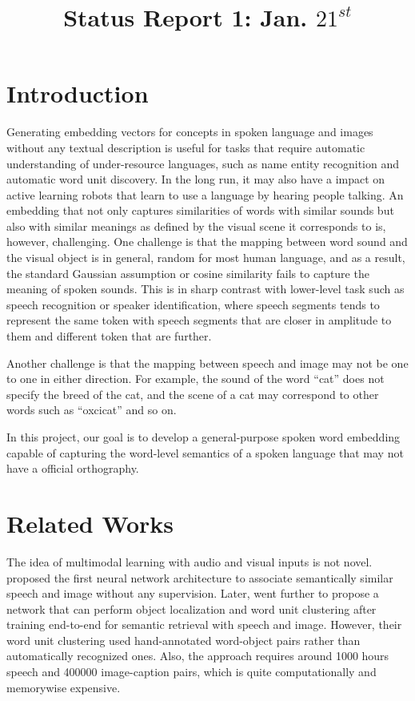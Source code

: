 \documentclass[a4paper]{article}
\title{Status Report 1: Jan. $21^{st}$}
\begin{document}
\maketitle
\section{Introduction}
Generating embedding vectors for concepts in spoken 
language
and images
without any textual description is useful for tasks
that require automatic understanding of under-resource languages, such as name entity recognition and
automatic word unit discovery. In the long run, it
may also have a impact on active learning robots that
learn to use a language by hearing people talking.
An embedding that not only
captures similarities of words with similar sounds but also with 
similar meanings as defined by the visual scene it 
corresponds to is, however, challenging. One challenge
is that the mapping between word sound and the
visual object is in general, random for most human
language, and as a result, the standard Gaussian 
assumption or cosine similarity fails to capture the
 meaning of spoken sounds. This is in sharp contrast
 with lower-level task such as speech recognition
 or speaker identification, where
 speech segments tends to represent the same
 token with speech segments that are closer in amplitude to them and different token that are further. 
 
 Another challenge is that the mapping between speech
 and image may not be one to one in either direction.
 For example, the sound of the word ``cat'' does not specify the
 breed of the cat, and the scene of a cat
 may correspond to other words such as ``oxcicat'' and so on.
 
 In this project, our goal is to develop a 
 general-purpose spoken word embedding capable of capturing the
 word-level semantics of a spoken language that may
 not have a official orthography.
 
\section{Related Works}
The idea of multimodal learning with audio and
visual inputs is not
novel. \cite{Harwath16-ULO} proposed the first 
neural network architecture to associate semantically similar speech 
and image without any supervision. Later, \cite{Harwath18} went further to propose a
network that can perform object localization 
and word unit clustering after training end-to-end for semantic retrieval with speech
and image. However, their word unit clustering
used hand-annotated word-object pairs rather
than automatically recognized ones. Also, the 
approach requires around 1000 hours speech and
400000 image-caption pairs, which is quite 
computationally and memorywise expensive.
\end{document}
